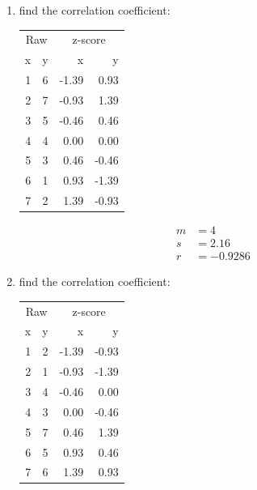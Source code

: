 \documentclass{exam}
\begin{document}
  \begin{enumerate}
    \item find the correlation coefficient:
      \begin{table}[ht]
      \centering
      \begin{tabular}{rrrr}
        \toprule
        \multicolumn{2}{c}{Raw} & \multicolumn{2}{c}{z-score } \\
        \cmidrule(r){1-2} \cmidrule(r){3-4} 
        x & y & x     & y \\
        \midrule
        1 & 6 & -1.39 & 0.93 \\
        2 & 7 & -0.93 & 1.39 \\
        3 & 5 & -0.46 & 0.46 \\
        4 & 4 & 0.00  & 0.00 \\
        5 & 3 & 0.46  & -0.46 \\
        6 & 1 & 0.93  & -1.39 \\
        7 & 2 & 1.39  & -0.93 \\
        \bottomrule
      \end{tabular}
      \end{table}

    \begin{solution}
      \begin{align*}
        m &= 4 \\
        s &= 2.16 \\
        r &= -0.9286
      \end{align*}
    \end{solution}

    \item find the correlation coefficient:
      \begin{table}[ht]
      \centering
      \begin{tabular}{rrrr}
        \toprule
        \multicolumn{2}{c}{Raw} & \multicolumn{2}{c}{z-score } \\
        \cmidrule(r){1-2} \cmidrule(r){3-4} 
        x & y & x     & y \\
        \midrule
        1 & 2 & -1.39 & -0.93 \\ 
        2 & 1 & -0.93 & -1.39 \\ 
        3 & 4 & -0.46 & 0.00 \\ 
        4 & 3 & 0.00 & -0.46 \\ 
        5 & 7 & 0.46 & 1.39 \\ 
        6 & 5 & 0.93 & 0.46 \\ 
        7 & 6 & 1.39 & 0.93 \\ 
        \bottomrule
      \end{tabular}
      \end{table}


\end{enumerate}
\end{document}
